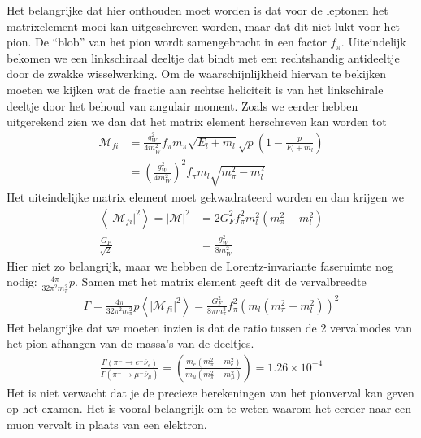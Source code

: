 \documentclass[../main.tex]{subfiles}
\begin{document}
Het belangrijke dat hier onthouden moet worden is dat voor de leptonen het matrixelement mooi kan uitgeschreven worden, maar dat dit niet lukt voor het pion. De ``blob'' van het pion wordt samengebracht in een factor $f_\pi$. Uiteindelijk bekomen we een linkschiraal deeltje dat bindt met een rechtshandig antideeltje door de zwakke wisselwerking. Om de waarschijnlijkheid hiervan te bekijken moeten we kijken wat de fractie aan rechtse heliciteit is van het linkschirale deeltje door het behoud van angulair moment. Zoals we eerder hebben uitgerekend zien we dan dat het matrix element herschreven kan worden tot
\begin{equation}
    \begin{aligned}
        \label{eq:pion_verval_matrix_final}
        \mathcal{M}_{fi} &= \frac{g_W^2}{4m_W^2} f_\pi m_\pi \sqrt{E_l+m_l}\sqrt{p}\left( 1 - \frac{p}{E_l+m_l} \right)\\
                         &= \left( \frac{g_W^2}{4m_W^2} \right)^2 f_\pi m_l \sqrt{m_\pi^2-m_l^2}
    \end{aligned}
\end{equation}
Het uiteindelijke matrix element moet gekwadrateerd worden en dan krijgen we 
\begin{equation}
    \begin{aligned}
        \label{eq:pion_verval_matrix_final_kwad}
        \left<|\mathcal{M}_{fi}|^2\right> = |\mathcal{M}|^2 &= 2G_F^2 f_\pi^2m_l^2(m_\pi^2-m_l^2)\\
        \frac{G_F}{\sqrt{2}} &= \frac{g_W^2}{8m_W^2}
    \end{aligned}
\end{equation}
Hier niet zo belangrijk, maar we hebben de Lorentz-invariante faseruimte nog nodig: $ \frac{4\pi}{32\pi^2m_\pi^2} p$. Samen met het matrix element geeft dit de vervalbreedte
\begin{equation}
    \begin{aligned}
        \label{eq:pion_verval_breedte}
        \Gamma = \frac{4\pi}{32\pi^2m_\pi^2} p \left<|\mathcal{M}_{fi}|^2\right> = \frac{G_F^2}{8\pi m_\pi^3} f_\pi^2 \left( m_l(m_\pi^2-m_l^2) \right)^2
    \end{aligned}
\end{equation}
Het belangrijke dat we moeten inzien is dat de ratio tussen de 2 vervalmodes van het pion afhangen van de massa's van de deeltjes.
\begin{equation}
    \begin{aligned}
        \label{eq:pion_verval_ratio}
        \frac{\Gamma(\pi^- \rightarrow e^-\overline \nu_e)}{\Gamma(\pi^- \rightarrow \mu^-\overline \nu_\mu)}  = \left( \frac{m_e(m_\pi^2 - m_e^2)}{m_\mu(m_\pi^2 - m_\mu^2)} \right) = 1.26 \times 10^{-4}
    \end{aligned}
\end{equation}
{\color{red} Het is niet verwacht dat je de precieze berekeningen van het pionverval kan geven op het examen. Het is vooral belangrijk om te weten waarom het eerder naar een muon vervalt in plaats van een elektron.}
\end{document}
